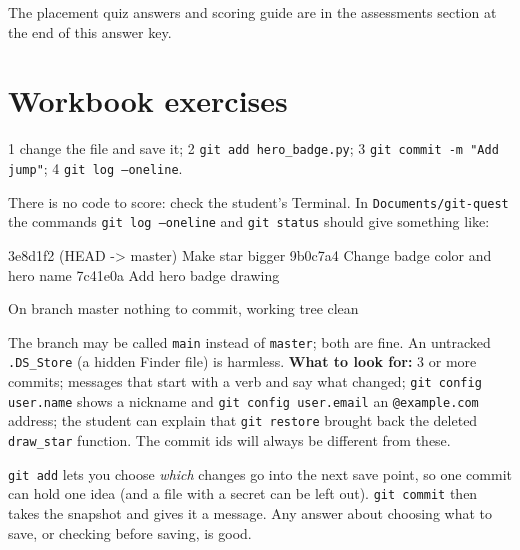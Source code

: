 
\begin{teachernote}
The placement quiz answers and scoring guide are in the assessments section at the end of this answer key.
\end{teachernote}

\section{Workbook exercises}
\begin{answer}
1 change the file and save it; 2 \texttt{git add hero\_badge.py}; 3 \texttt{git commit -m "Add jump"}; 4 \texttt{git log --oneline}.
\end{answer}

\begin{answer}
There is no code to score: check the student's Terminal. In \texttt{Documents/git-quest} the commands
\texttt{git log --oneline} and \texttt{git status} should give something like:
\begin{outputcode}
3e8d1f2 (HEAD -> master) Make star bigger
9b0c7a4 Change badge color and hero name
7c41e0a Add hero badge drawing

On branch master
nothing to commit, working tree clean
\end{outputcode}
The branch may be called \texttt{main} instead of \texttt{master}; both are fine. An untracked \texttt{.DS\_Store} (a hidden Finder file) is harmless.
\textbf{What to look for:} 3 or more commits; messages that start with a verb and say what changed;
\texttt{git config user.name} shows a nickname and \texttt{git config user.email} an \texttt{@example.com} address;
the student can explain that \texttt{git restore} brought back the deleted \texttt{draw\_star} function.
The commit ids will always be different from these.
\end{answer}

\begin{answer}
\texttt{git add} lets you choose \emph{which} changes go into the next save point, so one commit can hold one idea (and a file with a secret can be left out). \texttt{git commit} then takes the snapshot and gives it a message. Any answer about choosing what to save, or checking before saving, is good.
\end{answer}


